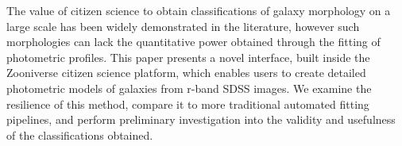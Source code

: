 \documentclass[../main.tex]{subfiles}
\begin{document}
The value of citizen science to obtain classifications of galaxy morphology on a large scale has been widely demonstrated in the literature, however such morphologies can lack the quantitative power obtained through the fitting of photometric profiles. This paper presents a novel interface, built inside the Zooniverse citizen science platform, which enables users to create detailed photometric models of galaxies from r-band SDSS images. We examine the resilience of this method, compare it to more traditional automated fitting pipelines, and perform preliminary investigation into the validity and usefulness of the classifications obtained.
\end{document}
